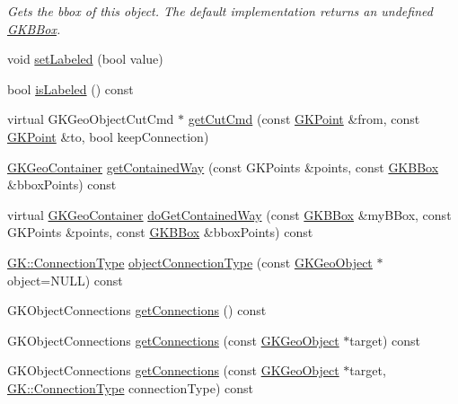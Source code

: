 \begin{DoxyCompactItemize}
\begin{DoxyCompactList}\small\item\em Gets the bbox of this object. The default implementation returns an undefined \hyperlink{classGKBBox}{G\+K\+B\+Box}. \end{DoxyCompactList}\item 
void \hyperlink{classGKGeoObject_a94546f583dd6e41cafab462f48030557}{set\+Labeled} (bool value)
\item 
bool \hyperlink{classGKGeoObject_afda581780cf5612911884bdc657c402d}{is\+Labeled} () const 
\item 
virtual G\+K\+Geo\+Object\+Cut\+Cmd $\ast$ \hyperlink{classGKGeoObject_aa59746e77c12c5632d8ea725dfb98966}{get\+Cut\+Cmd} (const \hyperlink{classGKPoint}{G\+K\+Point} \&from, const \hyperlink{classGKPoint}{G\+K\+Point} \&to, bool keep\+Connection)
\item 
\hyperlink{classGKGeoObject_ab07ccd042325dcfc9a4fce1f98e5ae51}{G\+K\+Geo\+Container} \hyperlink{classGKGeoObject_a171311a8af5f1df9c74cf065f856a609}{get\+Contained\+Way} (const G\+K\+Points \&points, const \hyperlink{classGKBBox}{G\+K\+B\+Box} \&bbox\+Points) const 
\item 
virtual \hyperlink{classGKGeoObject_ab07ccd042325dcfc9a4fce1f98e5ae51}{G\+K\+Geo\+Container} \hyperlink{classGKGeoObject_a11c419daf68511bd1c8f82c1d16bd7df}{do\+Get\+Contained\+Way} (const \hyperlink{classGKBBox}{G\+K\+B\+Box} \&my\+B\+Box, const G\+K\+Points \&points, const \hyperlink{classGKBBox}{G\+K\+B\+Box} \&bbox\+Points) const 
\item 
\hyperlink{namespaceGK_acff655917cf02cfbda984b465457ce74}{G\+K\+::\+Connection\+Type} \hyperlink{classGKGeoObject_a98217b2518e6f0d1c4ef46f5f508b4af}{object\+Connection\+Type} (const \hyperlink{classGKGeoObject}{G\+K\+Geo\+Object} $\ast$object=N\+U\+LL) const 
\item 
G\+K\+Object\+Connections \hyperlink{classGKGeoObject_a9cf197127c9a81f5409ebedaa82a6d28}{get\+Connections} () const 
\item 
G\+K\+Object\+Connections \hyperlink{classGKGeoObject_ac66c2b8d0eb86dbc2f308541c278a0da}{get\+Connections} (const \hyperlink{classGKGeoObject}{G\+K\+Geo\+Object} $\ast$target) const 
\item 
G\+K\+Object\+Connections \hyperlink{classGKGeoObject_a1181f330364245da88a149f94f1432cb}{get\+Connections} (const \hyperlink{classGKGeoObject}{G\+K\+Geo\+Object} $\ast$target, \hyperlink{namespaceGK_acff655917cf02cfbda984b465457ce74}{G\+K\+::\+Connection\+Type} connection\+Type) const 

\end{DoxyCompactItemize}
